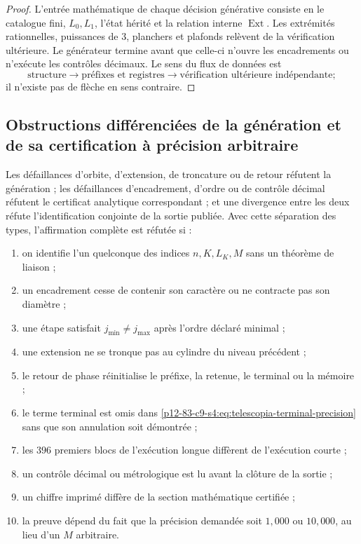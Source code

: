 \begin{proof}
L'entrée mathématique de chaque décision générative consiste en le catalogue
fini, \(L_0,L_1\), l'état hérité et la relation interne
\(\operatorname{Ext}\). Les extrémités rationnelles, puissances de \(3\), planchers et
plafonds relèvent de la vérification ultérieure. Le générateur termine avant
que celle-ci n'ouvre les encadrements ou n'exécute les contrôles décimaux. Le sens
du flux de données est
\[
 \text{structure}\longrightarrow
 \text{préfixes et registres}\longrightarrow
 \text{vérification ultérieure indépendante};
\]
il n’existe pas de flèche en sens contraire.
\end{proof}

\subsection{Obstructions différenciées de la génération et de sa certification à précision arbitraire}

\begin{criterion}
Les défaillances d'orbite, d'extension, de troncature ou de retour réfutent la génération ;
les défaillances d'encadrement, d'ordre ou de contrôle décimal réfutent le certificat
analytique correspondant ; et une divergence entre les deux réfute
l'identification conjointe de la sortie publiée. Avec cette séparation des types,
l'affirmation complète est réfutée si :
\begin{enumerate}
 \item on identifie l’un quelconque des indices \(n,K,L_K,M\) sans un
       théorème de liaison ;
 \item un encadrement cesse de contenir son caractère ou ne contracte pas son diamètre ;
 \item une étape satisfait \(j_{\min}\ne j_{\max}\) après l’ordre
       déclaré minimal ;
 \item une extension ne se tronque pas au cylindre du niveau précédent ;
 \item le retour de phase réinitialise le préfixe, la retenue, le terminal ou la mémoire ;
 \item le terme terminal est omis dans
       \eqref{p12-83-c9-s4:eq:telescopia-terminal-precision} sans que son annulation soit démontrée ;
 \item les \(396\) premiers blocs de l’exécution longue diffèrent de
       l’exécution courte ;
 \item un contrôle décimal ou métrologique est lu avant la clôture de la sortie ;
 \item un chiffre imprimé diffère de la section mathématique certifiée ;
 \item la preuve dépend du fait que la précision demandée soit \(1,000\) ou
       \(10,000\), au lieu d’un \(M\) arbitraire.
\end{enumerate}
\end{criterion}
